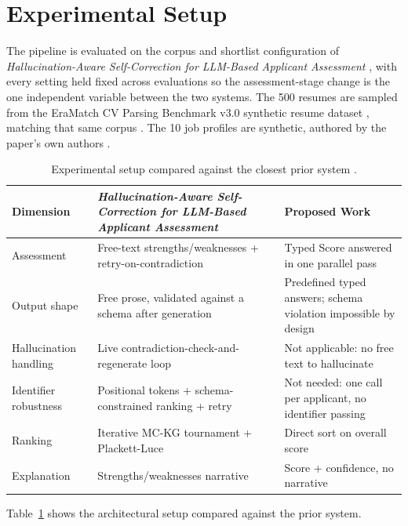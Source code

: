 \documentclass[journal]{IEEEtran}
\begin{document}
\section{Experimental Setup}
The pipeline is evaluated on the corpus and shortlist configuration of \emph{Hallucination-Aware Self-Correction for LLM-Based Applicant Assessment} \cite{ref2}, with every setting held fixed across evaluations so the assessment-stage change is the one independent variable between the two systems. The 500 resumes are sampled from the EraMatch CV Parsing Benchmark v3.0 synthetic resume dataset \cite{ref17}, matching that same corpus \cite{ref2}. The 10 job profiles are synthetic, authored by the paper's own authors \cite{ref2}.

\begin{table}[H]
\caption{Experimental setup compared against the closest prior system \cite{ref2}.}
\label{tab_comparison_setup}
\centering
\scriptsize
\setlength{\tabcolsep}{4.5pt}
\begin{tabular}{p{0.8in}p{1.05in}p{1.15in}}
\hline
Dimension & \emph{Hallucination-Aware Self-Correction for LLM-Based Applicant Assessment} \cite{ref2} & Proposed Work\\
\hline
Assessment & Free-text strengths/weaknesses + retry-on-contradiction & Typed Score answered in one parallel pass\\
Output shape & Free prose, validated against a schema after generation & Predefined typed answers; schema violation impossible by design\\
Hallucination handling & Live contradiction-check-and-regenerate loop & Not applicable: no free text to hallucinate\\
Identifier robustness & Positional tokens + schema-constrained ranking + retry & Not needed: one call per applicant, no identifier passing\\
Ranking & Iterative MC-KG tournament + Plackett-Luce & Direct sort on overall score\\
Explanation & Strengths/weaknesses narrative & Score + confidence, no narrative\\
\hline
\end{tabular}
\end{table}
Table~\ref{tab_comparison_setup} shows the architectural setup compared against the prior system.
\end{document}

